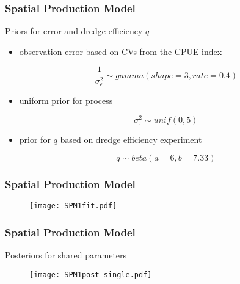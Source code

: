 \documentclass{beamer}
\begin{document}
\begin{frame}
\frametitle{Spatial Production Model}
Priors for error and dredge efficiency $q$

\begin{itemize}
    \item observation error based on CVs from the CPUE index

    \begin{equation*}
        \frac{1}{\sigma^2_\epsilon} \sim{gamma(shape=3, rate=0.4)}
    \end{equation*}

    \item uniform prior for process

    \begin{equation*}
        \sigma^2_\tau \sim{unif(0,5)}
    \end{equation*}

    \item prior for $q$ based on dredge efficiency experiment
   
    \begin{equation*}
        q \sim{beta(a=6, b=7.33)}
    \end{equation*}

\end{itemize}

\end{frame}


\begin{frame}
\frametitle{Spatial Production Model}

\begin{figure}
        \begin{center}
            \texttt{[image: SPM1fit.pdf]}
        \end{center}
    \end{figure}


\end{frame}



\begin{frame}
\frametitle{Spatial Production Model}
Posteriors for shared parameters

\begin{figure}
        \begin{center}
            \texttt{[image: SPM1post\_single.pdf]}
        \end{center}
    \end{figure}


\end{frame}
\end{document}
